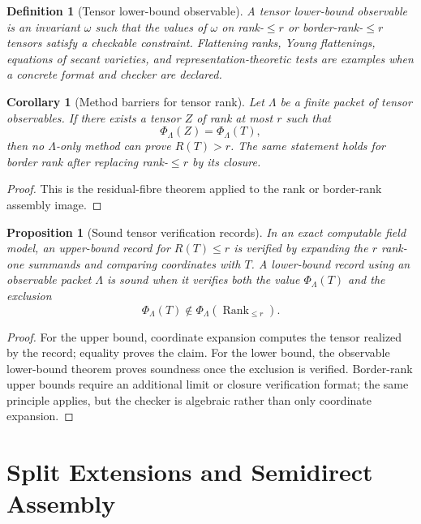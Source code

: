 \documentclass[11pt]{article}
\newtheorem{proposition}[theorem]{Proposition}
\newtheorem{corollary}[theorem]{Corollary}
\newtheorem{definition}[theorem]{Definition}
\begin{document}
\begin{definition}[Tensor lower-bound observable]
A tensor lower-bound observable is an invariant \(\omega\) such that the values of \(\omega\) on rank-\(\le r\) or border-rank-\(\le r\) tensors satisfy a checkable constraint.  Flattening ranks, Young flattenings, equations of secant varieties, and representation-theoretic tests are examples when a concrete format and checker are declared.
\end{definition}

\begin{corollary}[Method barriers for tensor rank]
Let \(\Lambda\) be a finite packet of tensor observables.  If there exists a tensor \(Z\) of rank at most \(r\) such that
\[
\Phi_{\Lambda}(Z)=\Phi_{\Lambda}(T),
\]
then no \(\Lambda\)-only method can prove \(R(T)>r\).  The same statement holds for border rank after replacing rank-\(\le r\) by its closure.
\end{corollary}

\begin{proof}
This is the residual-fibre theorem applied to the rank or border-rank assembly image.
\end{proof}

\begin{proposition}[Sound tensor verification records]
In an exact computable field model, an upper-bound record for \(R(T)\le r\) is verified by expanding the \(r\) rank-one summands and comparing coordinates with \(T\).  A lower-bound record using an observable packet \(\Lambda\) is sound when it verifies both the value \(\Phi_{\Lambda}(T)\) and the exclusion
\[
\Phi_{\Lambda}(T)\notin\Phi_{\Lambda}(\operatorname{Rank}_{\le r}).
\]
\end{proposition}

\begin{proof}
For the upper bound, coordinate expansion computes the tensor realized by the record; equality proves the claim.  For the lower bound, the observable lower-bound theorem proves soundness once the exclusion is verified.  Border-rank upper bounds require an additional limit or closure verification format; the same principle applies, but the checker is algebraic rather than only coordinate expansion.
\end{proof}

\section{Split Extensions and Semidirect Assembly}
\end{document}
